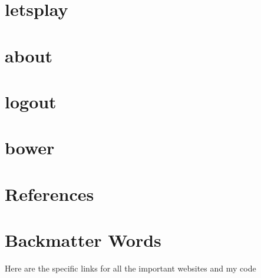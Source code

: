\documentclass{article}
\begin{document}
\section{letsplay}
\cleardoublepage

\section{about}
\cleardoublepage

\section{logout}
\cleardoublepage

\section{bower}


\cleardoublepage

\section{}


\cleardoublepage

\section{}
\cleardoublepage



\section{References}





\cleardoublepage




\appendix
\section{Backmatter Words}
Here are the specific links for all the important websites and my code
\end{document}
